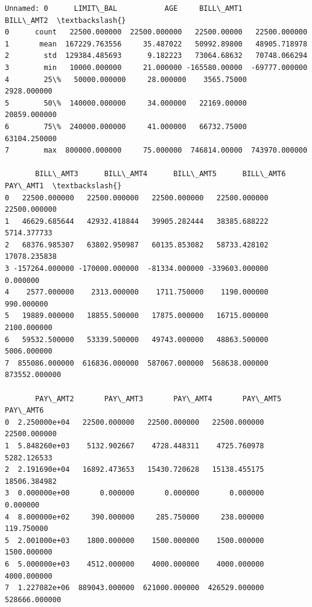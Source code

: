 \documentclass[11pt]{article}
\newcommand{\prompt}[4]{
        \llap{{\color{#2}[#3]: #4}}\vspace{-1.25em}
    }
\begin{document}
            \begin{tcolorbox}[breakable, boxrule=.5pt, size=fbox, pad at break*=1mm, opacityfill=0]
\prompt{Out}{outcolor}{6}{\hspace{3.5pt}}
\begin{Verbatim}[commandchars=\\\{\}]
  Unnamed: 0      LIMIT\_BAL           AGE     BILL\_AMT1      BILL\_AMT2  \textbackslash{}
0      count   22500.000000  22500.000000   22500.00000   22500.000000
1       mean  167229.763556     35.487022   50992.89800   48905.718978
2        std  129384.485693      9.182223   73064.68632   70748.066294
3        min   10000.000000     21.000000 -165580.00000  -69777.000000
4        25\%   50000.000000     28.000000    3565.75000    2928.000000
5        50\%  140000.000000     34.000000   22169.00000   20859.000000
6        75\%  240000.000000     41.000000   66732.75000   63104.250000
7        max  800000.000000     75.000000  746814.00000  743970.000000

       BILL\_AMT3      BILL\_AMT4      BILL\_AMT5      BILL\_AMT6       PAY\_AMT1  \textbackslash{}
0   22500.000000   22500.000000   22500.000000   22500.000000   22500.000000
1   46629.685644   42932.418844   39905.282444   38385.688222    5714.377733
2   68376.985307   63802.950987   60135.853082   58733.428102   17078.235838
3 -157264.000000 -170000.000000  -81334.000000 -339603.000000       0.000000
4    2577.000000    2313.000000    1711.750000    1190.000000     990.000000
5   19889.000000   18855.500000   17875.000000   16715.000000    2100.000000
6   59532.500000   53339.500000   49743.000000   48863.500000    5006.000000
7  855086.000000  616836.000000  587067.000000  568638.000000  873552.000000

       PAY\_AMT2       PAY\_AMT3       PAY\_AMT4       PAY\_AMT5       PAY\_AMT6
0  2.250000e+04   22500.000000   22500.000000   22500.000000   22500.000000
1  5.848260e+03    5132.902667    4728.448311    4725.760978    5282.126533
2  2.191690e+04   16892.473653   15430.720628   15138.455175   18506.384982
3  0.000000e+00       0.000000       0.000000       0.000000       0.000000
4  8.000000e+02     390.000000     285.750000     238.000000     119.750000
5  2.001000e+03    1800.000000    1500.000000    1500.000000    1500.000000
6  5.000000e+03    4512.000000    4000.000000    4000.000000    4000.000000
7  1.227082e+06  889043.000000  621000.000000  426529.000000  528666.000000
\end{Verbatim}
\end{tcolorbox}
        
\end{document}
